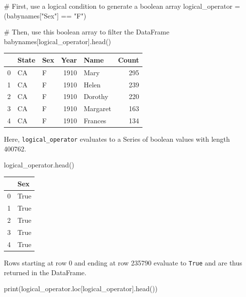 \documentclass[
  letterpaper,
  DIV=11,
  numbers=noendperiod]{scrreprt}
\newenvironment{Shaded}{\begin{snugshade}}{\end{snugshade}}
\newcommand{\BuiltInTok}[1]{\textcolor[rgb]{0.00,0.23,0.31}{#1}}
\newcommand{\CommentTok}[1]{\textcolor[rgb]{0.37,0.37,0.37}{#1}}
\newcommand{\NormalTok}[1]{\textcolor[rgb]{0.00,0.23,0.31}{#1}}
\newcommand{\OperatorTok}[1]{\textcolor[rgb]{0.37,0.37,0.37}{#1}}
\newcommand{\StringTok}[1]{\textcolor[rgb]{0.13,0.47,0.30}{#1}}
\begin{document}
\begin{Shaded}
\begin{Highlighting}[]
\CommentTok{\# First, use a logical condition to generate a boolean array}
\NormalTok{logical\_operator }\OperatorTok{=}\NormalTok{ (babynames[}\StringTok{"Sex"}\NormalTok{] }\OperatorTok{==} \StringTok{"F"}\NormalTok{)}

\CommentTok{\# Then, use this boolean array to filter the DataFrame}
\NormalTok{babynames[logical\_operator].head()}
\end{Highlighting}
\end{Shaded}

\begin{tabular}{lllrlr}
\toprule
{} & State & Sex &  Year &      Name &  Count \\
\midrule
0 &    CA &   F &  1910 &      Mary &    295 \\
1 &    CA &   F &  1910 &     Helen &    239 \\
2 &    CA &   F &  1910 &   Dorothy &    220 \\
3 &    CA &   F &  1910 &  Margaret &    163 \\
4 &    CA &   F &  1910 &   Frances &    134 \\
\bottomrule
\end{tabular}

Here, \texttt{logical\_operator} evaluates to a Series of boolean values
with length 400762.

\begin{Shaded}
\begin{Highlighting}[]
\NormalTok{logical\_operator.head()}
\end{Highlighting}
\end{Shaded}

\begin{tabular}{ll}
\toprule
{} &   Sex \\
\midrule
0 &  True \\
1 &  True \\
2 &  True \\
3 &  True \\
4 &  True \\
\bottomrule
\end{tabular}

Rows starting at row 0 and ending at row 235790 evaluate to
\texttt{True} and are thus returned in the DataFrame.

\begin{Shaded}
\begin{Highlighting}[]
\BuiltInTok{print}\NormalTok{(logical\_operator.loc[logical\_operator].head())}
\end{Highlighting}
\end{Shaded}
\end{document}

